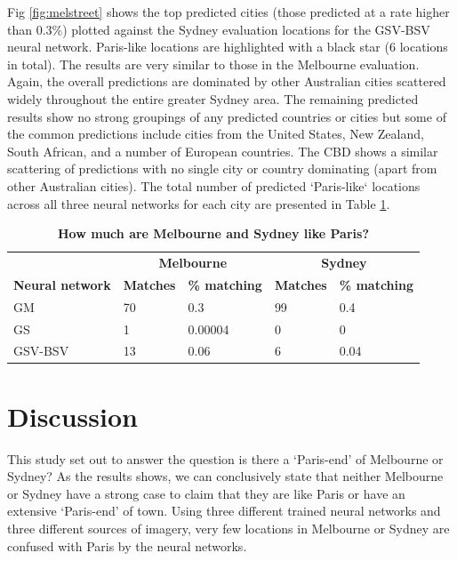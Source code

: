 \documentclass[10pt,letterpaper]{article}
\begin{document}

Fig \ref{fig:melstreet} shows the top predicted cities (those predicted at a rate higher than 0.3\%) plotted against the Sydney evaluation locations for the GSV-BSV neural network. Paris-like locations are highlighted with a black star (6 locations in total). The results are very similar to those in the Melbourne evaluation. Again, the overall predictions are dominated by other Australian cities scattered widely throughout the entire greater Sydney area. The remaining predicted results show no strong groupings of any predicted countries or cities but some of the common predictions include cities from the United States, New Zealand, South African, and a number of European countries. The CBD shows a similar scattering of predictions with no single city or country dominating (apart from other Australian cities). The total number of predicted `Paris-like` locations across all three neural networks for each city are presented in Table \ref{tab:melbournesydneyparis}.

\begin{table}[!htbp]
\caption{\bf How much are Melbourne and Sydney like Paris? \label{tab:melbournesydneyparis}}     
\begin{tabular}{ l  l l l  l}
 \hline    &  \multicolumn{2}{c}{\textbf{Melbourne}} & \multicolumn{2}{c}{\textbf{Sydney}}  \\  
\textbf{Neural network} & \textbf{Matches} & \textbf{\% matching}  & \textbf{Matches} & \textbf{\% matching}\\ \hline
GM & 70 & 0.3 & 99 & 0.4 \\ 
GS & 1 & 0.00004 & 0 & 0 \\ 
GSV-BSV & 13 & 0.06 & 6 & 0.04 \\ \hline
\end{tabular}
\end{table}


\section*{Discussion}\label{sec:discussion}
This study set out to answer the question is there a `Paris-end' of Melbourne or Sydney? As the results shows, we can conclusively state that neither Melbourne or Sydney have a strong case to claim that they are like Paris or have an extensive `Paris-end' of town. Using three different trained neural networks and three different sources of imagery, very few locations in Melbourne or Sydney are confused with Paris by the neural networks. 
\end{document}

